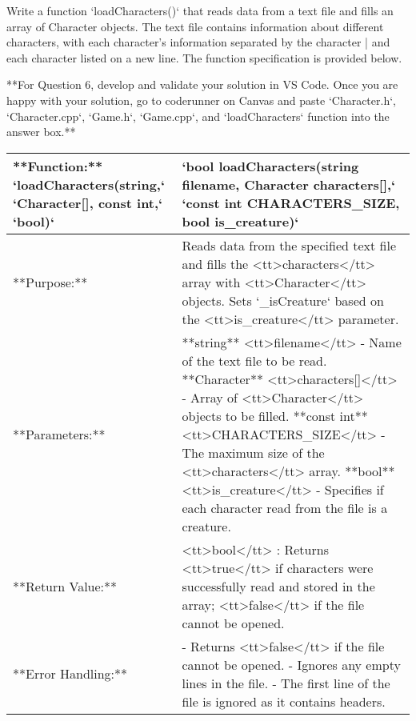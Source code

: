 {{{{{{{{{{{Write a function `loadCharacters()` that reads data from a text file and fills an array of Character objects. The text file contains information about different characters, with each character's information separated by the character | and each character listed on a new line. The function specification is provided below. \newline



**For Question 6, develop and validate your solution in VS Code. Once you are happy with your solution, go to coderunner on Canvas and paste `Character.h`, `Character.cpp`, `Game.h`, `Game.cpp`, and `loadCharacters` function into the answer box.** 

\renewcommand{\arraystretch}{1.5}
\begin{longtable}{|p{1.7in}|p{4.3in}|}
\hline
**Function:** `loadCharacters(string,` \newline `Character[], const int,` \newline `bool)` & `bool loadCharacters(string filename, Character characters[],` \newline `const int CHARACTERS_SIZE, bool is_creature)` \\ \hline

**Purpose:** & Reads data from the specified text file and fills the <tt>characters</tt> array with <tt>Character</tt> objects. Sets `_isCreature` based on the <tt>is\_creature</tt> parameter. \\ \hline

**Parameters:** & 
**string** <tt>filename</tt> - Name of the text file to be read. \newline
**Character** <tt>characters[]</tt> - Array of <tt>Character</tt> objects to be filled. \newline
**const int** <tt>CHARACTERS\_SIZE</tt> - The maximum size of the <tt>characters</tt> array. \newline
**bool** <tt>is\_creature</tt> - Specifies if each character read from the file is a creature. \\ \hline

**Return Value:** & <tt>bool</tt> : Returns <tt>true</tt> if characters were successfully read and stored in the array; <tt>false</tt> if the file cannot be opened. \\ \hline

**Error Handling:** & 
- Returns <tt>false</tt> if the file cannot be opened. \newline
- Ignores any empty lines in the file. \newline
- The first line of the file is ignored as it contains headers. \\ \hline
\end{longtable}

}}}}}}}}}}}
